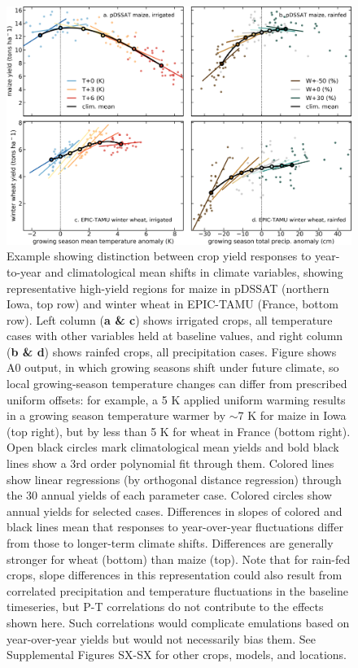 \documentclass[gmd, manuscript]{copernicus} %
\begin{document}
\begin{figure}[ht]
\centering
   \includegraphics[width=15cm]{figures/phase_II_em_figure_1.png}
   \caption{
   Example showing distinction between crop yield responses to year-to-year and climatological mean shifts in climate variables, showing representative high-yield regions for maize in pDSSAT (northern Iowa, top row) and winter wheat in EPIC-TAMU (France, bottom row).
   Left column (\textbf{a \& c}) shows irrigated crops, all temperature cases
   with other variables held at baseline values, and right column (\textbf{b \& d}) shows rainfed crops, all precipitation cases.
   Figure shows A0 output, in which growing seasons shift under future climate, so local growing-season temperature changes can differ from prescribed uniform offsets: for example, a 5 K applied uniform warming results in a growing season temperature warmer by $\sim$7 K for maize in Iowa (top right), but by less than 5 K for wheat in France (bottom right). 
   Open black circles mark climatological mean yields and bold black lines show a 3rd order polynomial fit through them. 
   Colored lines show linear regressions (by orthogonal distance regression) through the 30 annual yields of each parameter case.
   Colored circles show annual yields for selected cases.
   Differences in slopes of colored and black lines mean that responses to year-over-year fluctuations differ from those to longer-term climate shifts. Differences are generally stronger for wheat (bottom) than maize (top).
   Note that for rain-fed crops, slope differences in this representation could also result from correlated precipitation and temperature fluctuations in the baseline timeseries, but P-T correlations do not contribute to the effects shown here. 
   Such correlations would complicate emulations based on year-over-year yields but would not necessarily bias them.
   See Supplemental Figures SX-SX for other crops, models, and locations.
   }
   \label{fig:yearvclim}
\end{figure}
\end{document}
